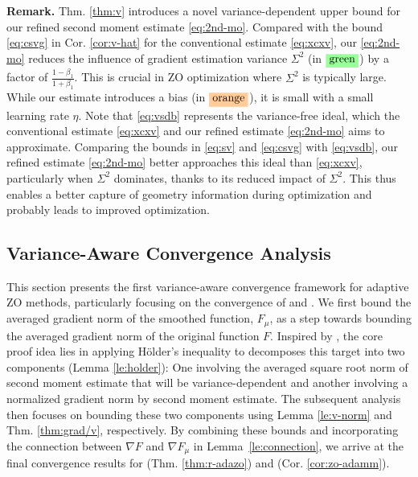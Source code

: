 \textbf{Remark.} Thm. \ref{thm:v} introduces a novel variance-dependent upper bound for our refined second moment estimate \eqref{eq:2nd-mo}. Compared with the bound \eqref{eq:csvg} in Cor. \ref{cor:v-hat} for the conventional estimate \eqref{eq:xcxv}, our \eqref{eq:2nd-mo} reduces the influence of gradient estimation variance $\Sigma^2$ (in $\coloredbox{green}{\text{green}}$) by a factor of $\frac{1-\beta_1}{1+\beta_1}$. This is crucial in ZO optimization where $\Sigma^2$ is typically large. While our estimate introduces a bias (in $\coloredbox{orange}{\text{orange}}$), it is small with a small learning rate $\eta$. Note that \eqref{eq:vsdb} represents the variance-free ideal, which the conventional estimate \eqref{eq:xcxv} and our refined estimate \eqref{eq:2nd-mo} aims to approximate. Comparing the bounds in \eqref{eq:sv} and \eqref{eq:csvg} with \eqref{eq:vsdb}, our refined estimate \eqref{eq:2nd-mo} better approaches this ideal than \eqref{eq:xcxv}, particularly when $\Sigma^2$ dominates, thanks to its reduced impact of $\Sigma^2$. This thus enables a better capture of geometry information during optimization and probably leads to improved optimization.


\subsection{Variance-Aware Convergence Analysis}\label{sec:conv}
This section presents the first variance-aware convergence framework for adaptive ZO methods, particularly focusing on the convergence of \ours{} and \base{}. We first bound the averaged gradient norm of the smoothed function, $F_{\mu}$, as a step towards bounding the averaged gradient norm of the original function $F$. Inspired by \citep{zhang2024convergence}, the core proof idea lies in applying H\"{o}lder's inequality to decomposes this target into two components (Lemma \ref{le:holder}): One involving the averaged square root norm of second moment estimate that will be variance-dependent and another involving a normalized gradient norm by second moment estimate. The subsequent analysis then focuses on bounding these two components using Lemma \ref{le:v-norm} and Thm. \ref{thm:grad/v}, respectively. 
By combining these bounds and incorporating the connection between $\nabla F$ and $\nabla F_{\mu}$ in Lemma~\ref{le:connection}, we arrive at the final convergence results for \ours{} (Thm. \ref{thm:r-adazo}) and  \base{} (Cor. \ref{cor:zo-adamm}).

